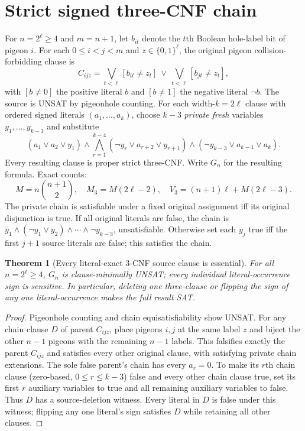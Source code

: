 \documentclass[11pt]{article}
\newtheorem{theorem}{Theorem}
\begin{document}
\section{Strict signed three-CNF chain}
For $n=2^\ell\ge4$ and $m=n+1$, let $b_{it}$ denote the $t$th Boolean hole-label bit of pigeon $i$. For each $0\le i<j<m$ and $z\in\{0,1\}^\ell$, the original pigeon collision-forbidding clause is
\[
C_{ijz}=\bigvee_{t<\ell}[b_{it}\ne z_t]\ \lor\ \bigvee_{t<\ell}[b_{jt}\ne z_t],
\]
with $[b\ne0]$ the positive literal $b$ and $[b\ne1]$ the negative literal $\neg b$. The source is UNSAT by pigeonhole counting. For each width-$k=2\ell$ clause with ordered signed literals $(a_1,\ldots,a_k)$, choose $k-3$ \emph{private fresh} variables $y_1,\ldots,y_{k-3}$ and substitute
\[
(a_1\lor a_2\lor y_1)\land
\bigwedge_{r=1}^{k-4}(\neg y_r\lor a_{r+2}\lor y_{r+1})
\land(\neg y_{k-3}\lor a_{k-1}\lor a_k).
\]
Every resulting clause is proper strict three-CNF. Write $G_n$ for the resulting formula. Exact counts:
\[
M=n\binom{n+1}{2},\quad
M_3=M(2\ell-2),\quad
V_3=(n+1)\ell+M(2\ell-3).
\]
The private chain is satisfiable under a fixed original assignment iff its original disjunction is true. If all original literals are false, the chain is $y_1\land(\neg y_1\lor y_2)\land\cdots\land\neg y_{k-3}$, unsatisfiable. Otherwise set each $y_j$ true iff the first $j+1$ source literals are false; this satisfies the chain.

\begin{theorem}[Every literal-exact 3-CNF source clause is essential]
For all $n=2^\ell\ge4$, $G_n$ is clause-minimally UNSAT; every individual literal-occurrence sign is sensitive. In particular, deleting one three-clause or flipping the sign of any one literal-occurrence makes the full result SAT.
\end{theorem}
\begin{proof}
Pigeonhole counting and chain equisatisfiability show UNSAT. For any chain clause $D$ of parent $C_{ijz}$, place pigeons $i,j$ at the same label $z$ and biject the other $n-1$ pigeons with the remaining $n-1$ labels. This falsifies exactly the parent $C_{ijz}$ and satisfies every other original clause, with satisfying private chain extensions. The sole false parent's chain has every $a_r=0$. To make its $r$th chain clause (zero-based, $0\le r\le k-3$) false and every other chain clause true, set its first $r$ auxiliary variables to true and all remaining auxiliary variables to false. Thus $D$ has a source-deletion witness. Every literal in $D$ is false under this witness; flipping any one literal's sign satisfies $D$ while retaining all other clauses.
\end{proof}
\end{document}
